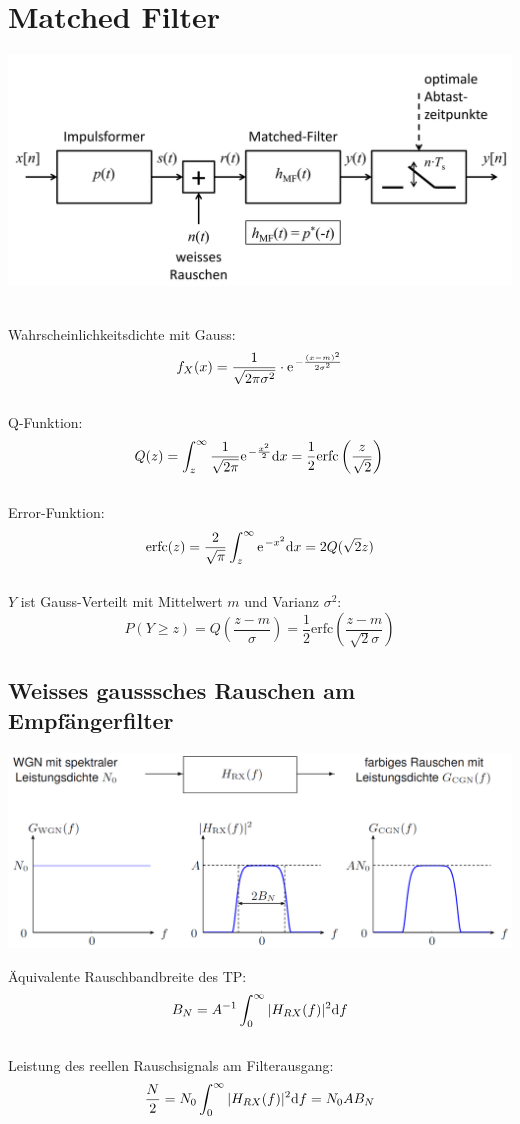 \chapter{Matched Filter}
\begin{center}
	\includegraphics[width=.9\textwidth]{../fig/matched}
\end{center}
~\\
Wahrscheinlichkeitsdichte mit Gauss:
\[
	f_X(x) = \frac{1}{\sqrt{2\pi\sigma^2}}\cdot\e^{-\frac{(x-m)^2}{2\sigma^2}}
\]
~\\
Q-Funktion:
\[
	Q(z) = \int_{z}^{\infty} \frac{1}{\sqrt{2\pi}}\e^{-\frac{x^2}{2}}\di x =
		\frac{1}{2}\textrm{erfc} \left( \frac{z}{\sqrt{2}} \right)
\]
~\\
Error-Funktion:
\[
	\textrm{erfc}(z) = \frac{2}{\sqrt{\pi}} \int_{z}^{\infty}\e^{-x^2}\di x = 2Q(\sqrt{2}z)
\]
~\\
$Y$ ist Gauss-Verteilt mit Mittelwert $m$ und Varianz $\sigma^2$:
\[
	P(Y\geq z) = Q\left(\frac{z-m}{\sigma}\right)
		= \frac{1}{2}\textrm{erfc}\left(\frac{z-m}{\sqrt{2}\sigma}\right)
\]

\section{Weisses gausssches Rauschen am Empfängerfilter}
\begin{center}
	\includegraphics[width=.9\textwidth]{../fig/wgn.png}
\end{center}
Äquivalente Rauschbandbreite des TP:
\[
	B_N = A^{-1} \int_{0}^{\infty}|H_{RX}(f)|^2 \mathrm{d} f
\]
~\\
Leistung des reellen Rauschsignals am Filterausgang:
\[
	\frac{N}{2} = N_0 \int_{0}^{\infty}|H_{RX}(f)|^2 \mathrm{d} f = N_0AB_N
\]

